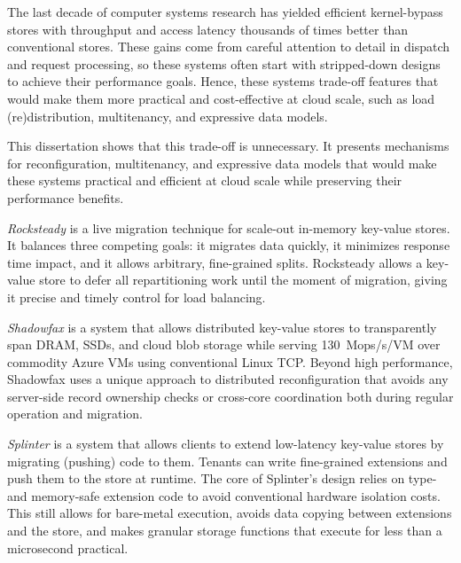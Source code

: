 The last decade of computer systems research has yielded efficient
kernel-bypass stores with throughput and access latency thousands
of times better than conventional stores.
%
These gains come from careful attention to detail in dispatch and
request processing,
so these systems often start with stripped-down designs to
achieve their performance goals.
%
Hence, these systems trade-off
features that
would make them more practical and cost-effective at cloud scale,
such as load (re)distribution, multitenancy, and
expressive data models.

This dissertation shows that this trade-off is unnecessary.
It presents mechanisms for
reconfiguration, multitenancy, and expressive data
models that
would make these systems practical and
efficient at cloud scale while preserving their performance
benefits.

\emph{Rocksteady}
is a live migration technique for scale-out
in-memory key-value stores.
%
It balances three competing goals: it
migrates data quickly, it minimizes response time impact, and it
allows arbitrary, fine-grained splits.
%
Rocksteady allows a key-value store to defer all repartitioning work
until the moment of migration, giving it precise and timely control for
load balancing.

\emph{Shadowfax} is
a system that
allows distributed key-value stores to
transparently span DRAM, SSDs, and cloud blob storage while serving
130~Mops/s/VM over commodity Azure VMs using conventional Linux TCP.
%
Beyond
high performance, Shadowfax uses a unique approach to distributed
reconfiguration that avoids any server-side record ownership checks
or cross-core coordination both during regular operation and migration.

\emph{Splinter} is a system that
allows clients
to extend low-latency key-value stores by migrating (pushing) code to them.
%
Tenants can write
fine-grained extensions and push
them to the store at runtime.
%
The core of
Splinter's design relies on type- and memory-safe
extension code to avoid conventional hardware isolation costs.
%
This
still allows for bare-metal execution, avoids data copying between
extensions and the store, and makes granular storage functions that
execute for less than
a microsecond practical.
